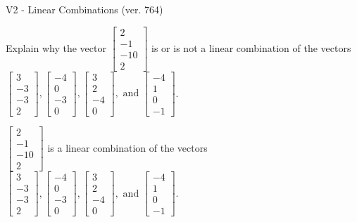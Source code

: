 \begin{exercise}
  \begin{exerciseTitle}V2 - Linear Combinations (ver. 764)\end{exerciseTitle}
  \begin{exerciseStatement}
    Explain why the vector \(\left[\begin{array}{c}
2 \\
-1 \\
-10 \\
2
\end{array}\right]\)  is or is not a linear 
	combination of the vectors \(\left[\begin{array}{c}
3 \\
-3 \\
-3 \\
2
\end{array}\right] , \left[\begin{array}{c}
-4 \\
0 \\
-3 \\
0
\end{array}\right] , \left[\begin{array}{c}
3 \\
2 \\
-4 \\
0
\end{array}\right] , \text{ and } \left[\begin{array}{c}
-4 \\
1 \\
0 \\
-1
\end{array}\right]\).
	


  \end{exerciseStatement}
  \begin{exerciseAnswer}
   \(\left[\begin{array}{c}
2 \\
-1 \\
-10 \\
2
\end{array}\right]\) 
  	 is  
	a linear combination of the vectors \(\left[\begin{array}{c}
3 \\
-3 \\
-3 \\
2
\end{array}\right] , \left[\begin{array}{c}
-4 \\
0 \\
-3 \\
0
\end{array}\right] , \left[\begin{array}{c}
3 \\
2 \\
-4 \\
0
\end{array}\right] , \text{ and } \left[\begin{array}{c}
-4 \\
1 \\
0 \\
-1
\end{array}\right]\).


\end{exerciseAnswer}
\end{exercise}
